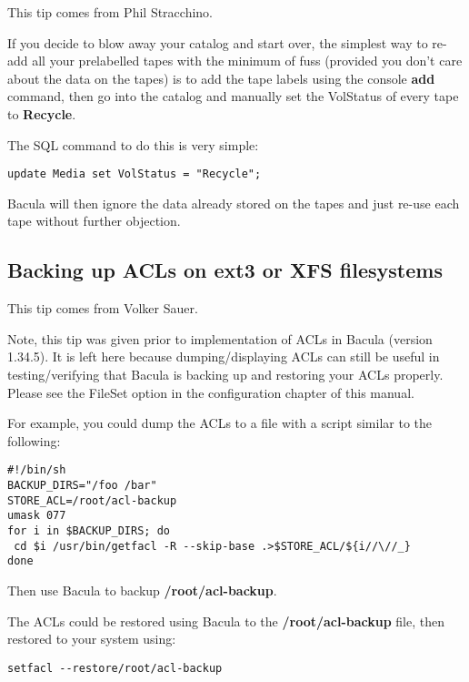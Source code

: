 {This tip comes from Phil Stracchino. 

If you decide to blow away your catalog and start over, the simplest way to
re-add all your prelabelled tapes with the minimum of fuss (provided you don't
care about the data on the tapes) is to add the tape labels using the console
{\bf add} command, then go into the catalog and manually set the VolStatus of
every tape to {\bf Recycle}. 

The SQL command to do this is very simple: 

\footnotesize
\begin{verbatim}
update Media set VolStatus = "Recycle";
\end{verbatim}
\normalsize

Bacula will then ignore the data already stored on the tapes and just re-use
each tape without further objection. 

\subsection*{Backing up ACLs on ext3 or XFS filesystems}
\label{ACLs}

This tip comes from Volker Sauer. 

Note, this tip was given prior to implementation of ACLs in Bacula (version
1.34.5). It is left here because dumping/displaying ACLs can still be useful
in testing/verifying that Bacula is backing up and restoring your ACLs
properly. Please see the 
 FileSet option in the
configuration chapter of this manual. 

For example, you could dump the ACLs to a file with a script similar to the
following: 

\footnotesize
\begin{verbatim}
#!/bin/sh
BACKUP_DIRS="/foo /bar"
STORE_ACL=/root/acl-backup
umask 077
for i in $BACKUP_DIRS; do
 cd $i /usr/bin/getfacl -R --skip-base .>$STORE_ACL/${i//\//_}
done
\end{verbatim}
\normalsize

Then use Bacula to backup {\bf /root/acl-backup}. 

The ACLs could be restored using Bacula to the {\bf /root/acl-backup} file,
then restored to your system using: 

\footnotesize
\begin{verbatim}
setfacl --restore/root/acl-backup
\end{verbatim}
\normalsize

}
